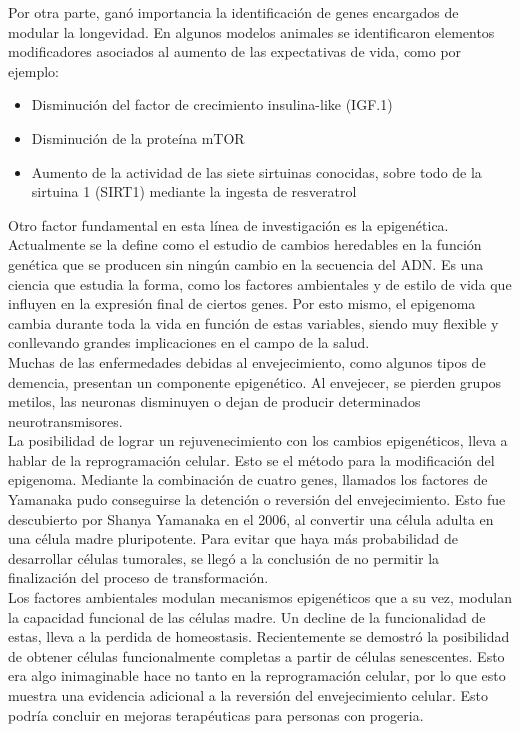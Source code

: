 Por otra parte, ganó importancia la identificación de genes encargados de modular la longevidad. En algunos modelos animales se identificaron elementos modificadores asociados al aumento de las expectativas de vida, como por ejemplo:
\begin{itemize}
	\item Disminución del factor de crecimiento insulina-like (IGF.1)
	\item Disminución de la proteína mTOR
	\item Aumento de la actividad de las siete sirtuinas conocidas, sobre todo de la sirtuina 1 (SIRT1) mediante la ingesta de resveratrol
\end{itemize}

Otro factor fundamental en esta línea de investigación es la epigenética. Actualmente se la define como el estudio de cambios heredables en la función genética que se producen sin ningún cambio en la secuencia del ADN. Es una ciencia que estudia la forma, como los factores ambientales y de estilo de vida que influyen en la expresión final de ciertos genes. Por esto mismo, el 
epigenoma cambia durante toda la vida en función de estas variables, siendo muy flexible y conllevando grandes implicaciones en el campo de la salud.\\

Muchas de las enfermedades debidas al envejecimiento, como algunos tipos de demencia, presentan un componente epigenético. Al envejecer, se pierden grupos metilos, las neuronas disminuyen o dejan de producir determinados neurotransmisores.\\

La posibilidad de lograr un rejuvenecimiento con los cambios epigenéticos, lleva a hablar de la reprogramación celular. Esto se el método para la modificación del epigenoma.	Mediante la combinación de cuatro genes, llamados los factores de Yamanaka pudo conseguirse la detención o reversión del envejecimiento. Esto fue descubierto por Shanya Yamanaka en el 2006, al convertir una célula adulta en una célula madre pluripotente. Para evitar que haya más probabilidad de desarrollar células tumorales, se llegó a la conclusión de no permitir la finalización del proceso de transformación.\\

Los factores ambientales modulan mecanismos epigenéticos que a su vez, modulan la capacidad funcional de las células madre.  Un decline de la funcionalidad de estas, lleva a la perdida de homeostasis. Recientemente se demostró la posibilidad de obtener células funcionalmente completas a partir de células senescentes. Esto era algo inimaginable hace no tanto en la reprogramación celular, por lo que esto muestra una evidencia adicional a la reversión del envejecimiento celular. Esto podría concluir en mejoras terapéuticas para personas con progeria.\\

